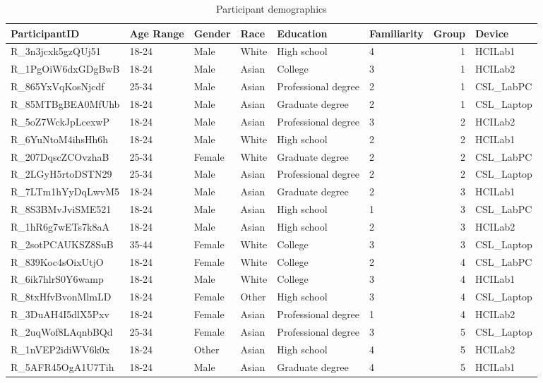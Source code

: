 \documentclass{article}
\begin{document}
\begin{table}
\caption{Participant demographics}
\label{tab:demographics}
\begin{tabular}{llllllrl}
\toprule
ParticipantID & Age Range & Gender & Race & Education & Familiarity & Group & Device \\
\midrule
R\_3n3jcxk5gzQUj51 & 18-24 & Male & White & High school & 4 & 1 & HCILab1 \\
R\_1PgOiW6dxGDgBwB & 18-24 & Male & Asian & College & 3 & 1 & HCILab2 \\
R\_865YxVqKosNjcdf & 25-34 & Male & Asian & Professional degree & 2 & 1 & CSL\_LabPC \\
R\_85MTBgBEA0MfUhb & 18-24 & Male & Asian & Graduate degree & 2 & 1 & CSL\_Laptop \\
R\_5oZ7WckJpLcexwP & 18-24 & Male & Asian & Professional degree & 3 & 2 & HCILab2 \\
R\_6YuNtoM4ihsHh6h & 18-24 & Male & White & High school & 2 & 2 & HCILab1 \\
R\_207DqscZCOvzhaB & 25-34 & Female & White & Graduate degree & 2 & 2 & CSL\_LabPC \\
R\_2LGyH5rtoDSTN29 & 25-34 & Male & Asian & Professional degree & 2 & 2 & CSL\_Laptop \\
R\_7LTm1hYyDqLwvM5 & 18-24 & Male & Asian & Graduate degree & 2 & 3 & HCILab1 \\
R\_8S3BMvJviSME521 & 18-24 & Male & Asian & High school & 1 & 3 & CSL\_LabPC \\
R\_1hR6g7wETs7k8aA & 18-24 & Male & Asian & High school & 2 & 3 & HCILab2 \\
R\_2sotPCAUKSZ8SuB & 35-44 & Female & White & College & 3 & 3 & CSL\_Laptop \\
R\_839Koc4sOixUtjO & 18-24 & Female & White & College & 2 & 4 & CSL\_LabPC \\
R\_6ik7hlrS0Y6wamp & 18-24 & Male & White & College & 3 & 4 & HCILab1 \\
R\_8txHfvBvonMlmLD & 18-24 & Female & Other & High school & 3 & 4 & CSL\_Laptop \\
R\_3DuAH4I5dlX5Pxv & 18-24 & Female & Asian & Professional degree & 1 & 4 & HCILab2 \\
R\_2uqWof8LAqnbBQd & 25-34 & Female & Asian & Professional degree & 3 & 5 & CSL\_Laptop \\
R\_1nVEP2idiWV6k0x & 18-24 & Other & Asian & High school & 4 & 5 & HCILab2 \\
R\_5AFR45OgA1U7Tih & 18-24 & Male & Asian & Graduate degree & 4 & 5 & HCILab1 \\

\end{tabular}
\end{table}
\end{document}
